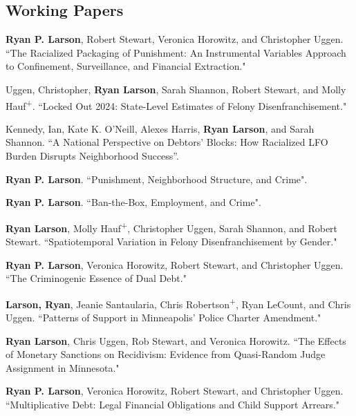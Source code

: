 \documentclass[letterpaper]{article}
\renewenvironment{itemize}{
  \begin{list}{}{
    \setlength{\leftmargin}{1.5em}
  }
}{
  \end{list}
}
\begin{document}
\subsection*{Working Papers}
\begin{itemize}


\item \textbf{Ryan P. Larson}, Robert Stewart, Veronica Horowitz, and Christopher Uggen. ``The Racialized Packaging of Punishment: An Instrumental Variables Approach to Confinement, Surveillance, and Financial Extraction." 
\item Uggen, Christopher, \textbf{Ryan Larson}, Sarah Shannon, Robert Stewart, and Molly Hauf\textsuperscript{+}. ``Locked Out 2024: State-Level Estimates of Felony Disenfranchisement."
\item Kennedy, Ian, Kate K. O’Neill, Alexes Harris, \textbf{Ryan Larson}, and Sarah Shannon. “A National Perspective on Debtors’ Blocks: How Racialized LFO Burden Disrupts Neighborhood Success”.
\item \textbf{Ryan P. Larson}. ``Punishment, Neighborhood Structure, and Crime".
\item \textbf{Ryan P. Larson}. ``Ban-the-Box, Employment, and Crime".
\item \textbf{Ryan Larson}, Molly Hauf\textsuperscript{+}, Christopher Uggen, Sarah Shannon, and Robert Stewart. ``Spatiotemporal Variation in Felony Disenfranchisement by Gender."
\item \textbf{Ryan P. Larson}, Veronica Horowitz, Robert Stewart, and Christopher Uggen. ``The Criminogenic Essence of Dual Debt."
\item \textbf{Larson, Ryan}, Jeanie Santaularia, Chris Robertson\textsuperscript{+}, Ryan LeCount, and Chris Uggen.  ``Patterns of Support in Minneapolis’ Police Charter Amendment." 
\item \textbf{Ryan Larson},  Chris Uggen, Rob Stewart, and Veronica Horowitz. ``The Effects of Monetary Sanctions on Recidivism: Evidence from Quasi-Random Judge Assignment in Minnesota."
\item \textbf{Ryan P. Larson}, Veronica Horowitz, Robert Stewart, and Christopher Uggen. ``Multiplicative Debt: Legal Financial Obligations and Child Support Arrears."


\end{itemize}
\end{document}
